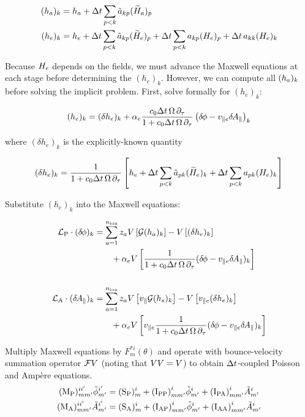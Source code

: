 %
\begin{align}
(h_a)_k & = h_a + {\Delta t} \sum_{p<k} {\tilde a}_{kp} ({\widetilde H}_a)_p 
\label{imex.ion}\\
(h_e)_k & = h_e + {\Delta t} \sum_{p<k} {\tilde a}_{kp} ({\widetilde H}_e)_p 
                + {\Delta t} \sum_{p<k} a_{kp} (H_e)_p + {\Delta t} \, 
                a_{kk} (H_e)_k
\label{imex.elec}
\end{align}


Because $H_e$ depends on the fields, we must advance the 
Maxwell equations at each stage before determining the 
$(h_e)_k$.  However, we can compute all $(h_a)_k$ before 
solving the implicit problem.  First, solve formally for 
$(h_e)_k$:

%
\begin{equation}
(h_e)_k = (\delta h_e)_k + \alpha_e \frac{c_0 {\Delta t} \, \Omega \, \partial_\tau}{1+c_0 {\Delta t} \, \Omega \, \partial_\tau} 
\left( {\delta \hskip -1pt \phi} - v_{\parallel e} {\delta \hskip -1pt A_\parallel} \right)_k 
\label{imex.he}
\end{equation}

where $(\delta h_e)_k$ is the explicitly-known quantity

%
\begin{equation}
(\delta h_e)_k = 
\frac{1}{1+c_0 {\Delta t} \, \Omega \, \partial_\tau} \left[ h_e + {\Delta t} \sum_{p<k} {\tilde a}_{pk} ({\widetilde H}_e)_k 
               + {\Delta t} \sum_{p<k} a_{pk} (H_e)_k \right ]
\label{imex.dhe}
\end{equation}

Substitute $(h_e)_k$ into the Maxwell equations:

%
\begin{align}
{\cal L}_{\rm P} \cdot (\delta \hskip -1pt \phi)_k & = \sum_{a=1}^{n_{\rm ion}} 
   z_a V\left[{\cal G} (h_a)_k \right] - 
        V \left[ (\delta h_e)_k \right] \notag \\
        & \qquad + \alpha_e V 
         \left[ \frac{1}{1+c_0 {\Delta t} \, \Omega \, \partial_\tau} (\delta \hskip -1pt \phi-v_{\parallel e}\delta \hskip -1pt A_\parallel)_k \right] \\
~\notag \\
{\cal L}_{\rm A} \cdot ({\delta \hskip -1pt A_\parallel})_k & = \sum_{a=1}^{n_{\rm ion}} 
 z_a V \left[v_\parallel {\cal G} (h_s)_k \right] - 
         V \left[v_{\parallel e} (\delta h_e)_k \right] \notag \\
        & \qquad + \alpha_e V
          \left[v_{\parallel e} \frac{1}{1+c_0 {\Delta t} \, \Omega \, \partial_\tau} (\delta \hskip -1pt \phi-v_{\parallel e}\delta \hskip -1pt A_\parallel)_k \right]
\end{align}

Multiply Maxwell equations by $F_m^{*i}(\theta)$ and operate 
with bounce-velocity summation operator ${\cal F}V$ (noting 
that $VV=V$) to obtain 
${\Delta t}$-coupled Poisson and Amp\`ere equations.
%
\begin{align}
({{\rm M}_{\rm P}})_{mm^\prime}^{ii^\prime} {\tilde{\phi}}_{m^\prime}^{i^\prime} & = 
  ({\rm S}_{\rm P})_m^i + {({\rm I}_{\rm PP})}^i_{mm^\prime} {\tilde{\phi}}_{m^\prime}^i 
              + {({\rm I}_{\rm PA})}^i_{mm^\prime} {\tilde{A}}_{m^\prime}^i \\
({\rm M}_{\rm A})_{mm^\prime}^{ii^\prime} {\tilde{A}}_{m^\prime}^{i^\prime} & = 
  ({\rm S}_{\rm A})_m^i + {({\rm I}_{\rm AP})}^i_{mm^\prime} {\tilde{\phi}}_{m^\prime}^i  
              + {({\rm I}_{\rm AA})}^i_{mm^\prime} {\tilde{A}}_{m^\prime}^i
\end{align}

